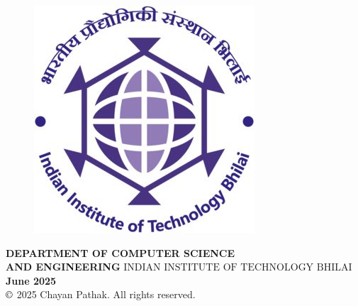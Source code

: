 \begin{center}
\begin{figure}[h]
	    \includegraphics[trim=0 0 0 0, clip, scale = 0.3] {1_front_matter/fig/iitbhlogo}
    \end{figure}
	\begin{Spacing}{1.5}
	    \textbf{ DEPARTMENT OF COMPUTER SCIENCE \\AND ENGINEERING}
	    \textbf{ $\mbox{INDIAN INSTITUTE OF TECHNOLOGY BHILAI}$}\\
	    \textbf{ June 2025}\\
		$\copyright $ 2025 Chayan Pathak. All rights reserved.
   	\end{Spacing}
\end{center}

\cleardoublepage